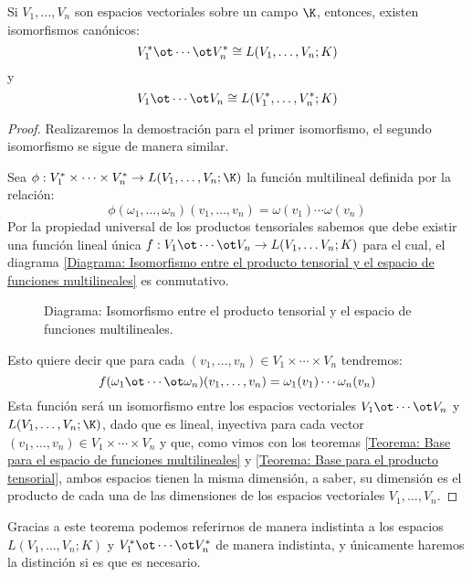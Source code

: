 \begin{theorem}
	\label{Teorema: Isomorfismo Entre Tensores y Funciones}
	Si $V_1, \ldots, V_n$ son espacios vectoriales sobre un campo $\K$, entonces,
	existen isomorfismos canónicos:
	\[ V_1^* \ot \cdots \ot V_n^* \cong L(V_1, \ldots, V_n; K) \]
	y
	\[ V_1 \ot \cdots \ot V_n \cong L(V_1^*, \ldots, V_n^*; K) \]
\end{theorem}

\begin{proof}
	Realizaremos la demostración para el primer isomorfismo, el segundo
	isomorfismo se sigue de manera similar.

	Sea $\phi: V_1^{*} \times \cdots \times V_n^{*} \to L(V_1, \ldots ,V_n; \K)$
	la función multilineal definida por la relación:
	\[
		\phi(\omega_1,\ldots,\omega_n)(v_1,\ldots,v_n)
		=
		\omega(v_1)\cdots\omega(v_n)
	\]
	Por la propiedad universal de los productos tensoriales sabemos que debe
	existir una función lineal única $f: V_1 \ot \cdots \ot V_n \to L(V_1, \ldots
		V_n; K)$ para el cual, el diagrama \ref{Diagrama: Isomorfismo entre el
		producto tensorial y el espacio de funciones multilineales} es conmutativo.
	\begin{figure}[h]
		\center
		
		\caption{Diagrama: Isomorfismo entre el producto tensorial y el espacio de
			funciones multilineales.}
		\label{Diagrama: Isomorfismo entre el
			producto tensorial y el espacio de funciones multilineales}
	\end{figure}
	Esto quiere decir que para cada $(v_1, \ldots, v_n) \in V_1 \times \cdots
		\times V_n$ tendremos:
	\[
		f(\omega_1 \ot \cdots \ot \omega_n)(v_1,\ldots,v_n)
		=
		\omega_1(v_1) \cdots \omega_n(v_n)
	\]
	Esta función será un isomorfismo entre los espacios vectoriales $V_1 \ot
		\cdots \ot V_n$ y $L(V_1,\ldots,V_n; \K)$, dado que es lineal, inyectiva para
	cada vector $(v_1, \ldots, v_n) \in V_1 \times \cdots \times V_n$ y que, como
	vimos con los teoremas \ref{Teorema: Base para el espacio de funciones
		multilineales} y \ref{Teorema: Base para el producto tensorial}, ambos
	espacios tienen la misma dimensión, a saber, su dimensión es el producto de
	cada una de las dimensiones de los espacios vectoriales $V_1, \ldots, V_n$.
\end{proof}

Gracias a este teorema podemos referirnos de manera indistinta a los espacios
$L(V_1,\ldots,V_n;K)$ y $V_1^* \ot \cdots \ot V_n^*$ de manera indistinta, y
únicamente haremos la distinción si es que es necesario.
